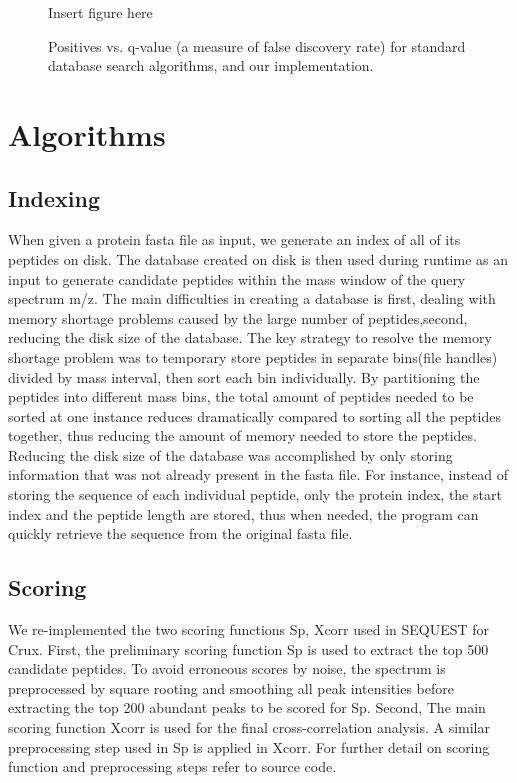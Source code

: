 \documentclass{bioinfo}
\begin{document}
\begin{figure}
  \centering
  Insert figure here
  \caption{Positives vs. q-value (a measure of false discovery rate) for
  standard database search algorithms, and our implementation.}
  \label{figure:indexing}
\end{figure}



\section{Algorithms}

\subsection*{Indexing}
When given a protein fasta file as input, we generate an index of all
of its peptides on disk. The database created on disk is then used
during runtime as an input to generate candidate peptides within the
mass window of the query spectrum m/z. The main difficulties in
creating a database is first, dealing with memory shortage problems
caused by the large number of peptides,second, reducing the disk size
of the database. The key strategy to resolve the memory shortage
problem was to temporary store peptides in separate bins(file handles)
divided by mass interval, then sort each bin individually. By
partitioning the peptides into different mass bins, the total amount
of peptides needed to be sorted at one instance reduces dramatically
compared to sorting all the peptides together, thus reducing the
amount of memory needed to store the peptides. Reducing the disk size
of the database was accomplished by only storing information that was
not already present in the fasta file. For instance, instead of
storing the sequence of each individual peptide, only the protein
index, the start index and the peptide length are stored, thus when
needed, the program can quickly retrieve the sequence from the
original fasta file.

\subsection*{Scoring}
We re-implemented the two scoring functions Sp, Xcorr used in SEQUEST
for Crux.  First, the preliminary scoring function Sp is used to
extract the top 500 candidate peptides. To avoid erroneous scores by
noise, the spectrum is preprocessed by square rooting and smoothing
all peak intensities before extracting the top 200 abundant peaks to
be scored for Sp.  Second, The main scoring function Xcorr is used for
the final cross-correlation analysis. A similar preprocessing step
used in Sp is applied in Xcorr. For further detail on scoring function
and preprocessing steps refer to source code.
\end{document}
